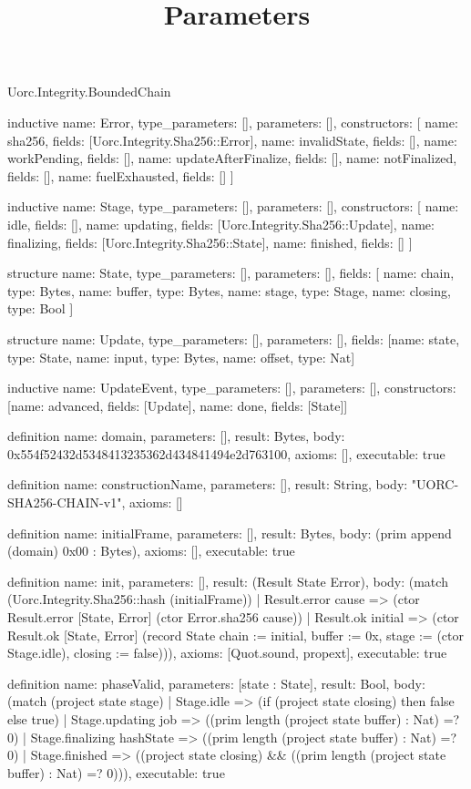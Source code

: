 \begin{lexlean}{Uorc.Integrity.BoundedChain}
\title{Parameters}
\begin{semanticmodule}
inductive{
  name: Error,
  type_parameters: [],
  parameters: [],
  constructors: [
    {name: sha256, fields: [Uorc.Integrity.Sha256::Error]},
    {name: invalidState, fields: []},
    {name: workPending, fields: []},
    {name: updateAfterFinalize, fields: []},
    {name: notFinalized, fields: []},
    {name: fuelExhausted, fields: []}
  ]
}

inductive{
  name: Stage,
  type_parameters: [],
  parameters: [],
  constructors: [
    {name: idle, fields: []},
    {name: updating, fields: [Uorc.Integrity.Sha256::Update]},
    {name: finalizing, fields: [Uorc.Integrity.Sha256::State]},
    {name: finished, fields: []}
  ]
}

structure{
  name: State,
  type_parameters: [],
  parameters: [],
  fields: [
    {name: chain, type: Bytes},
    {name: buffer, type: Bytes},
    {name: stage, type: Stage},
    {name: closing, type: Bool}
  ]
}

structure{
  name: Update,
  type_parameters: [],
  parameters: [],
  fields: [{name: state, type: State}, {name: input, type: Bytes}, {name: offset, type: Nat}]
}

inductive{
  name: UpdateEvent,
  type_parameters: [],
  parameters: [],
  constructors: [{name: advanced, fields: [Update]}, {name: done, fields: [State]}]
}

definition{
  name: domain,
  parameters: [],
  result: Bytes,
  body: 0x554f52432d5348413235362d434841494e2d763100,
  axioms: [],
  executable: true
}

definition{
  name: constructionName,
  parameters: [],
  result: String,
  body: "UORC-SHA256-CHAIN-v1",
  axioms: []
}

definition{
  name: initialFrame,
  parameters: [],
  result: Bytes,
  body: (prim append (domain) 0x00 : Bytes),
  axioms: [],
  executable: true
}

definition{
  name: init,
  parameters: [],
  result: (Result State Error),
  body: (match (Uorc.Integrity.Sha256::hash (initialFrame))
    | Result.error cause => (ctor Result.error [State, Error] (ctor Error.sha256 cause))
    | Result.ok initial => (ctor Result.ok [State, Error] (record State {chain := initial, buffer := 0x, stage := (ctor Stage.idle), closing := false}))),
  axioms: [Quot.sound, propext],
  executable: true
}

definition{
  name: phaseValid,
  parameters: [state : State],
  result: Bool,
  body: (match (project state stage)
    | Stage.idle => (if (project state closing) then false else true)
    | Stage.updating job => ((prim length (project state buffer) : Nat) =? 0)
    | Stage.finalizing hashState => ((prim length (project state buffer) : Nat) =? 0)
    | Stage.finished => ((project state closing) && ((prim length (project state buffer) : Nat) =? 0))),
  executable: true
}


\end{semanticmodule}
\end{lexlean}
